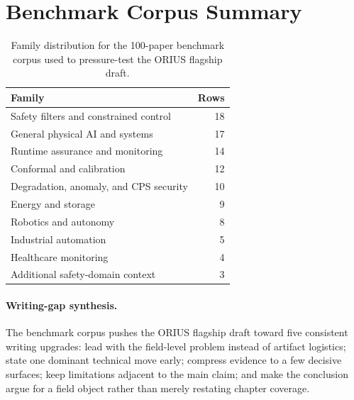 \section{Benchmark Corpus Summary}
\label{sec:ieee-benchmark-summary}
\begin{table}[t]
\centering
\begin{tabular}{p{}r}
\toprule
\textbf{Family} & \textbf{Rows}\\
\midrule
Safety filters and constrained control & 18\\
General physical AI and systems & 17\\
Runtime assurance and monitoring & 14\\
Conformal and calibration & 12\\
Degradation, anomaly, and CPS security & 10\\
Energy and storage & 9\\
Robotics and autonomy & 8\\
Industrial automation & 5\\
Healthcare monitoring & 4\\
Additional safety-domain context & 3\\
\bottomrule
\end{tabular}
\caption{Family distribution for the 100-paper benchmark corpus used to pressure-test the ORIUS flagship draft.}
\label{tab:ieee-benchmark-family-summary}
\end{table}

\paragraph{Writing-gap synthesis.}
The benchmark corpus pushes the ORIUS flagship draft toward five consistent writing upgrades: lead with the field-level problem instead of artifact logistics; state one dominant technical move early; compress evidence to a few decisive surfaces; keep limitations adjacent to the main claim; and make the conclusion argue for a field object rather than merely restating chapter coverage.
